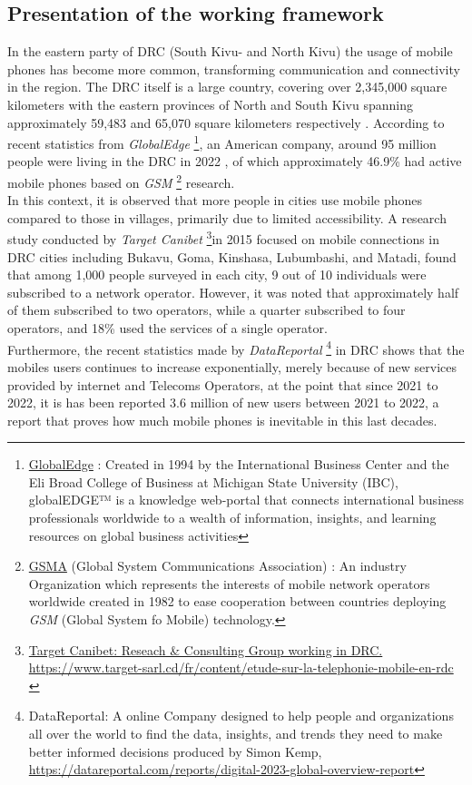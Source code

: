 \documentclass[12pt,a4paper, oneside]{book}
\begin{document}
		\subsection{Presentation of the working framework}  
		In the eastern party of DRC (South Kivu- and North Kivu) the usage of mobile phones has become more common, transforming communication and connectivity in the region. 
	The DRC itself is a large country, covering over 2,345,000 square kilometers with the eastern provinces of North and South Kivu spanning approximately 59,483 and 65,070 square kilometers respectively \cite{giswatch2018}. According to recent statistics from \textit{GlobalEdge} \footnote{ \href{https://globaledge.msu.edu/}{GlobalEdge}  : Created in 1994 by the International Business Center and the Eli Broad College of Business at Michigan State University (IBC), globalEDGE™ is a knowledge web-portal that connects international business professionals worldwide to a wealth of information, insights, and learning resources on global business activities}, an American company, around 95 million people were living in the DRC in 2022 \cite{monusco2015}, of which approximately 46.9\% had active mobile phones based on \textit{GSM} \footnote{\href{https://www.gsma.com/aboutus/}{GSMA}  (Global System Communications Association) : An industry Organization which represents the interests of mobile network operators worldwide created in 1982 to ease cooperation between countries deploying \textit{GSM} (Global System fo Mobile) technology.} research. \\ 
		
		In this context, it is observed that more people in cities use mobile phones compared to those in villages, primarily due to limited accessibility. A research study conducted by \textit{Target Canibet} \footnote{\href{https://www.target-sarl.cd/fr/content/etude-sur-la-telephonie-mobile-en-rdc}{Target Canibet: Reseach \& Consulting Group working in DRC. \url{https://www.target-sarl.cd/fr/content/etude-sur-la-telephonie-mobile-en-rdc} }}in 2015 focused on mobile connections in DRC cities including Bukavu, Goma, Kinshasa, Lubumbashi, and Matadi, found that among 1,000 people surveyed in each city, 9 out of 10 individuals were subscribed to a network operator. However, it was noted that approximately half of them subscribed to two operators, while a quarter subscribed to four operators, and 18\% used the services of a single operator.  \\
		
		Furthermore, the recent statistics made by \textit{DataReportal} \footnote{DataReportal: A online Company designed to help people and organizations all over the world to find the data, insights, and trends they need to make better informed decisions produced by Simon Kemp, \url{https://datareportal.com/reports/digital-2023-global-overview-report}}  in DRC shows that the mobiles users continues to increase exponentially, merely because of new services provided by internet and Telecoms Operators, at the point that since 2021 to 2022, it is has been reported 3.6 million of new users between 2021 to 2022, a report that proves how much mobile phones is inevitable in this last decades.
			
\end{document}
